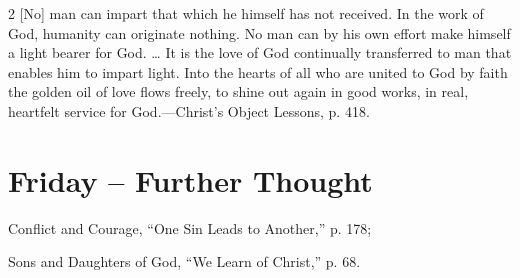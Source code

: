 \documentclass[a4paper, 10pt, twoside, headings=small]{scrartcl}
\begin{document}
\begin{multicols}{2}
[No] man can impart that which he himself has not received. In the work of God, humanity can originate nothing. No man can by his own effort make himself a light bearer for God. … It is the love of God continually transferred to man that enables him to impart light. Into the hearts of all who are united to God by faith the golden oil of love flows freely, to shine out again in good works, in real, heartfelt service for God.—Christ’s Object Lessons, p. 418.

\section*{Friday – Further Thought}

\setlength{\parindent}{0pt}Conflict and Courage, “One Sin Leads to Another,” p. 178;

Sons and Daughters of God, “We Learn of Christ,” p. 68.

\end{multicols}
\end{document}
